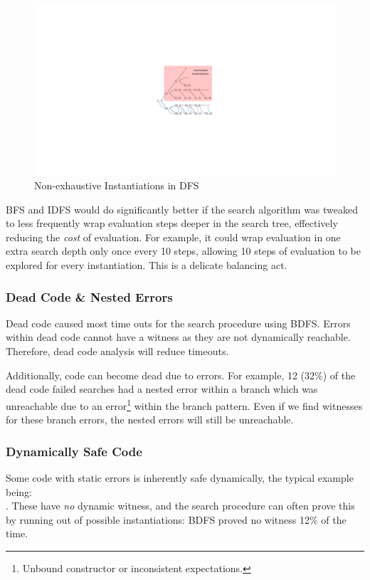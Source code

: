 \begin{figure}[H]
\centering
\includegraphics[width=1.25\textwidth, trim={15cm 10cm 10cm 10cm},clip]{Media/Figures/DFS}
\caption{Non-exhaustive Instantiations in DFS}
\label{fig:DFS}
\end{figure}
BFS and IDFS would do significantly better if the search algorithm was tweaked to less frequently wrap evaluation steps deeper in the search tree, effectively reducing the \textit{cost} of evaluation. For example, it could wrap evaluation in one extra search depth only once every 10 steps, allowing 10 steps of evaluation to be explored for every instantiation. This is a delicate balancing act.

\subsubsection{Dead Code \& Nested Errors}

Dead code caused most time outs for the search procedure using BDFS. Errors within dead code cannot have a witness as they are not dynamically reachable. Therefore, dead code analysis will reduce timeouts.

Additionally, code can become dead due to errors. For example, 12 (32\%) of the dead code failed searches had a nested error within a branch which was unreachable due to an error\footnote{Unbound constructor or inconsistent expectations.} within the branch pattern. Even if we find witnesses for these branch errors, the nested errors will still be unreachable.


\subsubsection{Dynamically Safe Code}
Some code with static errors is inherently safe dynamically, the typical example being:\\ . These have \textit{no} dynamic witness, and the search procedure can often prove this by running out of possible instantiations: BDFS proved no witness 12\% of the time. 

